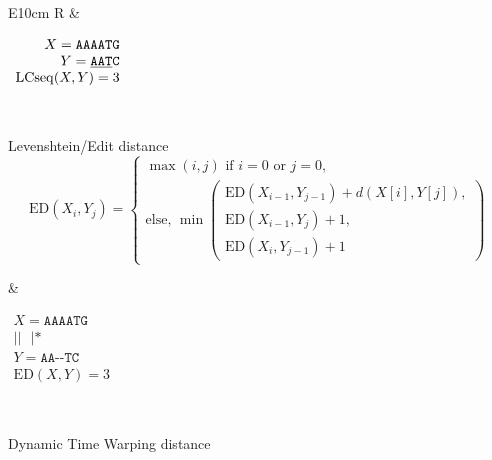 \begin{table}
{\begin{tabularx}{\textwidth}{E{10cm}   R}
        &
        \hfill
        \begin{minipage}{4cm} \renewcommand{\arraystretch}{1}
            \hfill
            $\begin{array}{r}
                X= \mathrm{\texttt{AAAATG}}\\
                Y= \mathrm{\texttt{\underline{AAT}C}}\\
                \mathrm{LCseq}(X,Y)=3
            \end{array}$
        \end{minipage}\\
        \begin{minipage}{10cm} \renewcommand{\arraystretch}{1}
            Levenshtein/Edit distance \\
            $$ \mathrm{ED}(X_i,Y_j)= \left\{
                \begin{array}{l}
                    \max(i,j) \mbox{ if } i=0 \mbox{ or } j=0 {,} \\
                    \mbox{else, } \min 
                    \begin{pmatrix}
                        \mathrm{ED}(X_{i-1},Y_{j-1})+d(X[i],Y[j]), \\
                        \mathrm{ED}(X_{i-1},Y_j)+1, \\
                        \mathrm{ED}(X_i,Y_{j-1})+1
                    \end{pmatrix} 
                \end{array} \right. $$
                \vspace{0.5cm}
            \end{minipage}
            &
            \hfill
            \begin{minipage}{4cm} \renewcommand{\arraystretch}{1}
                \hfill
                $\begin{array}{r}
                    X= \mathrm{\texttt{AAAATG}}\\
                    \mathrm{\texttt{||~~|*}}\\
                    Y= \mathrm{\texttt{AA-{-}TC}}\\
                    \mathrm{ED}(X,Y)=3
                \end{array}$
        \end{minipage}\\
        \begin{minipage}{10cm} \renewcommand{\arraystretch}{1}
            Dynamic Time Warping distance \\ 

\end{minipage}
\end{tabularx}}
\end{table}

